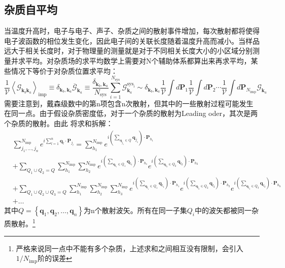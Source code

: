\documentclass[10pt,openany]{book}
\theoremstyle{thmstyle} %
\theoremstyle{defstyle} %
\theoremstyle{prostyle} %
\begin{document}
\subsection*{杂质自平均}
当温度升高时，电子与电子、声子、杂质之间的散射事件增加，每次散射都将使得电子波函数的相位发生变化，因此电子间的关联长度随着温度升高而减小。当样品远大于相关长度时，对于物理量的测量就是对于不同相关长度大小的小区域分别测量并求平均。对杂质场的求平均数学上需要对N个辅助体系都算出来再求平均，某些情况下等价于对杂质位置求平均：
\begin{equation}
  \frac{1}{\mathcal{V}}\left\langle\mathcal{G}_{\mathbf{k}_b \mathbf{k}_a}\right\rangle_{\mathrm{imp}} \equiv \delta_{\mathbf{k}_b, \mathbf{k}_a} \overline{\mathcal{G}}_{\mathbf{k}_a} \equiv \frac{\delta_{\mathbf{k}_b, \mathbf{k}_a}}{N_{\mathrm{sys}}} \sum_{i=1}^{N_{\mathrm{sys}}} \mathcal{G}_{\mathbf{k}_a}^{\mathrm{sys}_{\mathrm{i}}} \sim \delta_{\mathbf{k}_b, \mathbf{k}_a} \frac{1}{\mathcal{V}} \int d \mathbf{P}_1 \frac{1}{\mathcal{V}} \int d \mathbf{P}_2 \cdots \frac{1}{\mathcal{V}} \int d \mathbf{P}_{N_{\mathrm{imp}}} \mathcal{G}_{\mathbf{k}_a}
\end{equation}
需要注意到，戴森级数中的第n项包含n次散射，但其中的一些散射过程可能发生在同一点。由于假设杂质密度低，对于一个杂质的散射为Leading oder，其次是两个杂质的散射。由此
将求和拆解：
\begin{equation}
  \begin{aligned}
    & \sum_{j_1, \ldots, j_n}^{N_{\mathrm{imp}}} e^{i \sum_{l=1}^n \mathbf{q}_l \cdot \mathbf{P}_{j_l}}=\sum_{h_1}^{N_{\mathrm{imp}}} e^{i\left(\sum_{\mathbf{q}_{j_1} \in Q} \mathbf{q}_{j_1}\right) \cdot \mathbf{P}_{h_1}} \\
    & +\sum_{Q_1 \cup Q_2=Q} \sum_{h_1}^{N_{\mathrm{imp}}} \sum_{h_2}^{N_{\mathrm{imp}}} e^{i\left(\sum_{\mathbf{q}_{l_1} \in Q_1} \mathbf{q}_{l_1}\right) \cdot \mathbf{P}_{h_1}} e^{i\left(\sum_{\mathbf{q}_{l_2} \in Q_2} \mathbf{q}_{l_2}\right) \cdot \mathbf{P}_{h_2}} \\
    & +\sum_{Q_1 \cup Q_2 \cup Q_3=Q} \sum_{h_1}^{N_{\mathrm{imp}}} \sum_{h_2}^{N_{\mathrm{imp}}} \sum_{h_3}^{N_{\mathrm{imp}}} e^{i\left(\sum_{\mathbf{q}_{l_1} \in Q_1} \mathbf{q}_{l_1}\right) \cdot \mathbf{P}_{h_1}} e^{i\left(\sum_{\mathbf{q}_{l_2} \in Q_2} \mathbf{q}_{l_2}\right) \cdot \mathbf{P}_{h_2}} e^{i\left(\sum_{\mathbf{q}_{l_3} \in Q_3} \mathbf{q}_{l_3}\right) \cdot \mathbf{P}_{h_h}}\\
    & +\ldots
    \end{aligned}
\end{equation}
其中$ Q=\left\{\mathbf{q}_1, \mathbf{q}_2, \ldots, \mathbf{q}_n\right\} $为n个散射波矢。所有在同一子集$ Q_i $中的波矢都被同一杂质散射。\footnote{严格来说同一点中不能有多个杂质，上述求和之间相互没有限制，会引入$ 1 / N_{\mathrm{imp}} $阶的误差 }\\
\end{document}
